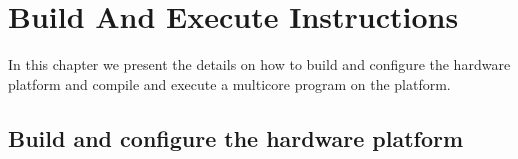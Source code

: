 \documentclass[a4paper,fontsize=10pt,twoside,DIV15,BCOR12mm,headinclude=true,footinclude=false,pagesize,bibtotoc]{scrbook}
\newcommand{\nopublish}[1]{}
\begin{document}
\nopublish{

\section{Circulating tokens - WCET}

This exercise will show how to calculate the maximum worst case throughput of tokens.
The exercise comprise the following tasks:
\begin{itemize}
\item Compile with platin
\item 
\label{list:ex2:num1}\end{itemize}

\section{Next exercise}

Ideas to other exercises:
\begin{itemize}
\item WCET analysis of the circulating tokens
  \begin{itemize}
  \item Worst case throughput of tokens
  \item Worst case latency of a token through two processors
  \end{itemize}
\item Health monitoring 
\item I/O server
\end{itemize}

}
\appendix

\chapter{Build And Execute Instructions}
\label{apx:build}

In this chapter we present the details on how to 
build and configure the hardware platform and compile and execute 
a multicore program on the platform.

\section{Build and configure the hardware platform}
\label{apx:buildhw}
\end{document}
